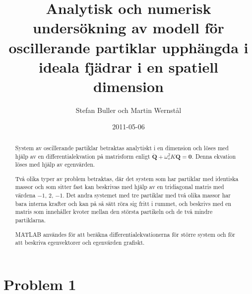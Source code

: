 \documentclass[12pt,a4paper]{article}
\begin{document}

\title{Analytisk och numerisk undersökning av modell för oscillerande partiklar upphängda i ideala fjädrar i en spatiell dimension}
	\author{Stefan Buller och Martin Wernstål}
	\date{2011-05-06}
	\maketitle{}
	\thispagestyle{empty}

	\begin{abstract}
		System av oscillerande partiklar betraktas analytiskt i en dimension och löses
		med hjälp av en differentialekvation på matrisform enligt 
		$\mathbf{\ddot{Q}}+\omega_o^2K\mathbf{Q}=\mathbf{0}$.
		Denna ekvation löses med hjälp av egenvärden.
		
		Två olika typer av problem betraktas, där det system som har partiklar med
		identiska massor och som sitter fast kan beskrivas med hjälp av en tridiagonal
		matris med värdena $-1$, $2$, $-1$.
		Det andra systemet med tre partiklar med två olika massor har bara interna
		krafter och kan på så sätt röra sig fritt i rummet, och beskrivs med en matris
		som innehåller kvoter mellan den största partikeln och de två mindre partiklarna.
		
		MATLAB användes för att beräkna differentialekvationerna för större system
		och för att beskriva egenvektorer och egenvärden grafiskt.
	\end{abstract}

\newpage{}

	\tableofcontents{}
	\thispagestyle{empty}

\newpage{}

	\setcounter{page}{1}
	\pagestyle{plain}
	
	
\section{Problem 1}
	
	\vspace{-24pt}
	
\end{document}
